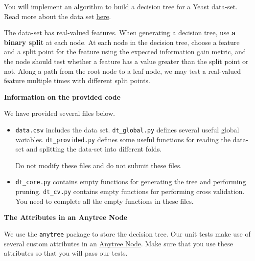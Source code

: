 \documentclass[12pt]{article}
\begin{document}
You will implement an algorithm to build a decision tree for a Yeast data-set. Read more about the data set  \href{https://archive.ics.uci.edu/ml/datasets/Yeast}{here}.

The data-set has real-valued features. When generating a decision tree, use {\bf a binary split} at each node. At each node in the decision tree, choose a feature and a split point for the feature using the expected information gain metric, and the node should test whether a feature has a value greater than the split point or not. Along a path from the root node to a leaf node, we may test a real-valued feature multiple times with different split points.

{\bf Information on the provided code}

We have provided several files below.
\begin{itemize}

\item \verb+data.csv+ includes the data set. \verb+dt_global.py+ defines several useful global variables. \verb+dt_provided.py+ defines some useful functions for reading the data-set and splitting the data-set into different folds.

Do not modify these files and do not submit these files.

\item \verb+dt_core.py+ contains empty functions for generating the tree and performing pruning. \verb+dt_cv.py+ contains empty functions for performing cross validation. You need to complete all the empty functions in these files.

\end{itemize}

{\bf The Attributes in an Anytree Node}

We use the \verb+anytree+ package to store the decision tree. Our unit tests make use of several custom attributes in an \href{https://anytree.readthedocs.io/en/latest/api/anytree.node.html#anytree.node.node.Node}{Anytree Node}. Make sure that you use these attributes so that you will pass our tests.
\end{document}
